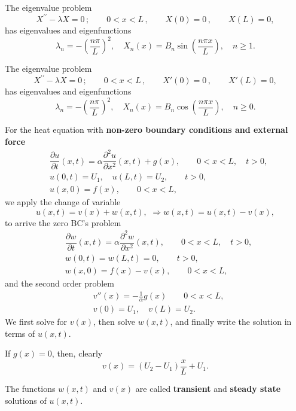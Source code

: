 \documentclass[11pt]{article}
\begin{document}
\begin{preamble}
\begin{formulaitem}

\item The eigenvalue problem
\begin{equation*}
X^{\prime \prime} - \lambda X =0\,; \qquad  0<x<L \,, \qquad X(0)=0  \,,\qquad X(L) =0,
\end{equation*}
has eigenvalues and eigenfunctions
\[\lambda_{n}=-\left( \frac{n\pi}{L}\right)^{2}, \quad X_{n}(x)=B_{n}\sin\left( \frac{n\pi x}{L} \right), \quad  n\geq 1.\]


\item The eigenvalue problem
\begin{equation*}
X^{\prime \prime} - \lambda X =0\,; \qquad  0<x<L \,, \qquad X'(0)=0  \,,\qquad X'(L) =0,
\end{equation*}
has eigenvalues and eigenfunctions
\[\lambda_{n}=-\left( \frac{n\pi}{L}\right)^{2}, \quad X_{n}(x)=B_{n}\cos\left( \frac{n\pi x}{L} \right), \quad  n\geq 0.\]

\item For the heat equation with \textbf{non-zero boundary conditions and external force}
\begin{equation*} \begin{split}
& \dfrac{\partial u }{\partial t } (x,t) = \alpha\dfrac{\partial^2 u}{\partial x^2}(x,t) + g(x), \qquad 0<x<L, \quad t>0, \\
& u(0,t) = U_{1}, \quad u(L,t)= U_{2}, \qquad t>0, \\
& u(x,0) = f(x), \qquad 0<x<L,
\end{split}\end{equation*}
we apply the change of variable
\[u(x,t)=v(x)+w(x,t), \,\, \Rightarrow w(x,t)=u(x, t)-v(x),\]
to arrive the zero BC's problem
\begin{equation*} \begin{split}
& \dfrac{\partial w }{\partial t } (x,t) = \alpha\dfrac{\partial^2 w}{\partial x^2}(x,t), \qquad 0<x<L, \quad t>0, \\
& w(0,t) = w(L,t)= 0, \qquad t>0, \\
& w(x,0) = f(x) - v(x), \qquad 0<x<L,
\end{split}\end{equation*}
and the second order problem
\begin{equation*} \begin{split}
& v''(x) = -\tfrac{1}{\alpha}g(x) \qquad 0<x<L, \\
& v(0) = U_{1}, \quad v(L)= U_{2}.
\end{split}\end{equation*}
We first solve for $v(x)$, then solve $w(x,t)$, and finally write the solution in terms of $u(x,t)$.

If $g(x)=0$, then, clearly
\[v(x)=(U_{2}-U_{1})\frac{x}{L}+U_{1}.\]

The functions $w(x, t)$ and $v(x)$ are called \textbf{transient} and \textbf{steady state} solutions of $u(x,t)$.

\end{formulaitem}
\end{preamble}
\end{document}
